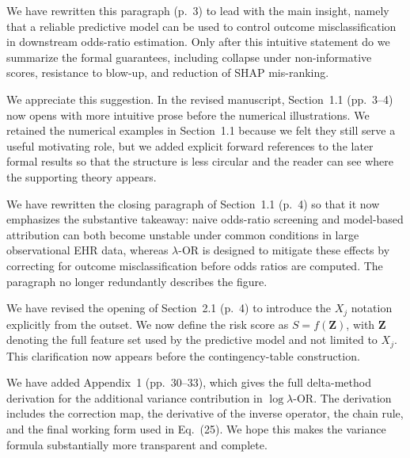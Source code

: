 \documentclass[onecolumn,11pt]{IEEEtran}
\begin{document}
We have rewritten this paragraph (p.~3) to lead with the main insight, namely that a reliable predictive model can be used to control outcome misclassification in downstream odds-ratio estimation. Only after this intuitive statement do we summarize the formal guarantees, including collapse under non-informative scores, resistance to blow-up, and reduction of SHAP mis-ranking.

We appreciate this suggestion. In the revised manuscript, Section~1.1 (pp.~3--4) now opens with more intuitive prose before the numerical illustrations. We retained the numerical examples in Section~1.1 because we felt they still serve a useful motivating role, but we added explicit forward references to the later formal results so that the structure is less circular and the reader can see where the supporting theory appears.

We have rewritten the closing paragraph of Section~1.1 (p.~4) so that it now emphasizes the substantive takeaway: naive odds-ratio screening and model-based attribution can both become unstable under common conditions in large observational EHR data, whereas $\lambda$-OR is designed to mitigate these effects by correcting for outcome misclassification before odds ratios are computed. The paragraph no longer redundantly describes the figure.

We have revised the opening of Section~2.1 (p.~4) to introduce the $X_j$ notation explicitly from the outset. We now define the risk score as $S=f(\mathbf{Z})$, with $\mathbf{Z}$ denoting the full feature set used by the predictive model and not limited to $X_j$. This clarification now appears before the contingency-table construction.

We have added Appendix~1 (pp.~30--33), which gives the full delta-method derivation for the additional variance contribution in $\log \lambda$-OR. The derivation includes the correction map, the derivative of the inverse operator, the chain rule, and the final working form used in Eq.~(25). We hope this makes the variance formula substantially more transparent and complete.
\end{document}
